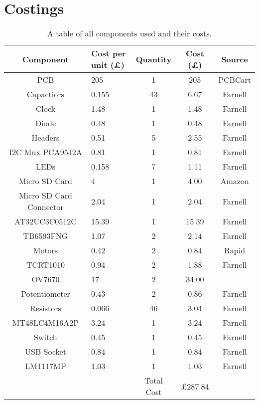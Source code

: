 \chapter{Costings} \label{Appendix:Costings}

\begin{table}
\centering
\begin{tabular}{|c|p{2cm}|c|c|c|} \hline
Component	&	Cost per unit (\pounds)	& Quantity 	&	Cost (\pounds)		&	Source		\\ \hline
PCB			&	205						&	1		&	205					&	PCBCart		\\
Capactiors	&	0.155 					& 	43		& 	6.67 				& 	Farnell 	\\
Clock 		& 	1.48					& 	1		&	1.48 				& 	Farnell		\\
Diode		&	0.48					&	1		&	0.48				&	Farnell 	\\
Headers		&	0.51 					&	5		&	2.55				&	Farnell 	\\
I2C Mux PCA9542A &	0.81				&	1		&	0.81				&	Farnell		\\
LEDs 		&	0.158					&	7		& 	1.11 				&	Farnell		\\
Micro SD Card &	4						&	1		&	4.00 				&	Amazon 		\\
Micro SD Card Connector & 2.04			&	1		&	2.04				&	Farnell		\\
AT32UC3C0512C	&15.39					&	1		&	15.39				&	Farnell		\\
TB6593FNG 	&	1.07 					&	2 		&	2.14 				&	Farnell 	\\
Motors  	&	0.42					&	2		&	0.84				&	Rapid 		\\
TCRT1010	& 	0.94 					&	2		&	1.88 				&	Farnell 	\\
OV7670		&	17						&	2		&	34.00				& 				\\
Potentiometer	&	0.43				&	2		&	0.86				&	Farnell 	\\
Resistors	&	0.066 					& 	46		&	3.04 				&	Farnell 	\\
MT48LC4M16A2P	& 3.24  				& 	1		&	3.24 				&	Farnell		\\
Switch		&	0.45					&	1		&	0.45				&	Farnell 	\\
USB Socket	&	0.84 					&	1		& 	0.84 				&	Farnell 	\\
LM1117MP	&	1.03					&	1		&	1.03	 			&	Farnell		\\ \hline \cline{3-4}
\multicolumn{2}{c|}{ }					& Total Cost  & \pounds 287.84		&	\multicolumn{1}{|c}{ }			\\ \cline{3-4}
\end{tabular}
\caption{A table of all components used and their costs.}
\label{table:Costings}
\end{table}